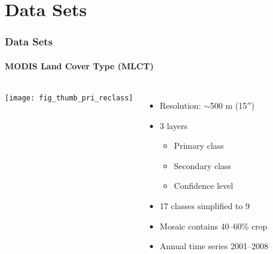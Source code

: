 \documentclass{beamer}
\begin{document}
\section{Data Sets}




\begin{frame}
  \frametitle{Data Sets}
  \framesubtitle{MODIS Land Cover Type (MLCT)}
  \begin{columns}
    \column{2.5in}
    \texttt{[image: fig\_thumb\_pri\_reclass]}
    \column{2.5in}
    \begin{itemize}
      \pause
    \item Resolution: $\sim$500 m (15$''$)
    \item 3 layers
      \begin{itemize}
        \pause
      \item Primary class
        \pause
      \item Secondary class
        \pause
      \item Confidence level
      \end{itemize}
      \pause
    \item 17 classes simplified to 9
      \pause
    \item Mosaic contains 40--60\% crop
      \pause
    \item Annual time series 2001--2008
    \end{itemize}
  \end{columns}
\end{frame}
\end{document}
